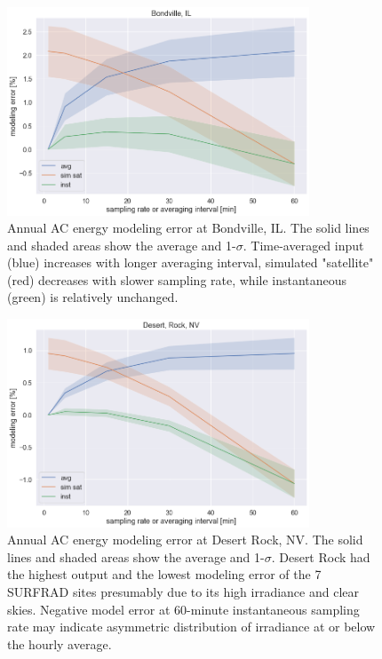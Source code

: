 \documentclass[conference]{IEEEtran}
\begin{document}
\begin{figure}[htbp]
\centerline{\includegraphics[width=9cm]{analysis/bon_all.png}}
\caption{Annual AC energy modeling error at Bondville, IL. The solid lines and shaded areas show the average and 1-$\sigma$. Time-averaged input (blue) increases with longer averaging interval, simulated "satellite" (red) decreases with slower sampling rate, while instantaneous (green) is relatively unchanged.}
\label{fig:bon2010}
\end{figure}

\begin{figure}[htbp]
\centerline{\includegraphics[width=9cm]{analysis/dra_all.png}}
\caption{Annual AC energy modeling error at Desert Rock, NV. The solid lines and shaded areas show the average and 1-$\sigma$. Desert Rock had the highest output and the lowest modeling error of the 7 SURFRAD sites presumably due to its high irradiance and clear skies. Negative model error at 60-minute instantaneous sampling rate may indicate asymmetric distribution of irradiance at or below the hourly average.}
\label{fig:dra2011}
\end{figure}
\end{document}
